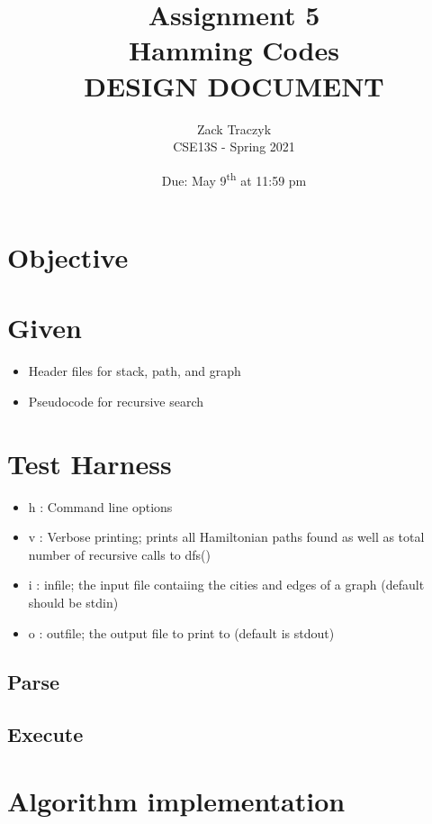 \documentclass[12pt]{article}
\title{%
\textbf{Assignment 5 \\ 
Hamming Codes \\
\large DESIGN DOCUMENT} }
\author{Zack Traczyk \\ CSE13S - Spring 2021}
\date{Due: May 9\textsuperscript{th} at 11:59 pm}
\begin{document}
    \maketitle

	\section{Objective}


	\section{Given}

	\begin{itemize}
		\item{Header files for stack, path, and graph}
		\item{Pseudocode for recursive search}
	\end{itemize}


	\section{Test Harness}


	\begin{itemize}
		\item{h : Command line options }
		\item{v : Verbose printing; prints all Hamiltonian paths found as well
			as total number of recursive calls to dfs()}
		\item{i : infile; the input file contaiing the cities and edges of a graph (default should be stdin)}
		\item{o : outfile; the output file to print to (default is stdout)}
	\end{itemize}

	\subsection{Parse}

	\subsection{Execute}

	\section{Algorithm implementation}
\end{document}
